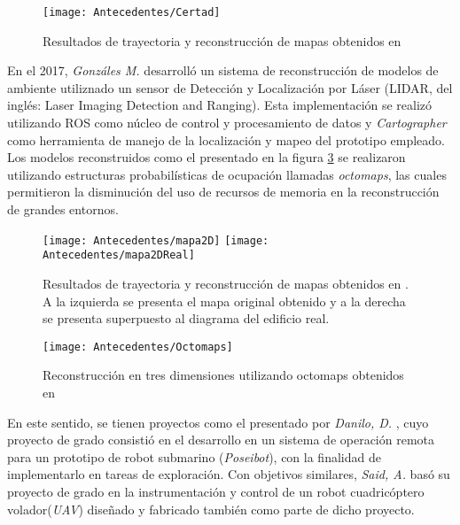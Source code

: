 \begin{figure}[H]
	\centering
	\texttt{[image: Antecedentes/Certad]}
	\caption{Resultados de trayectoria y reconstrucción de mapas obtenidos en \cite{novel}}
	\label{imagen:Antecedentes/Certad}
\end{figure}





En el 2017, \textit{Gonzáles M.} \cite{manuel} desarrolló un sistema de reconstrucción de modelos de ambiente utiliznado un sensor de Detección y Localización por Láser (LIDAR, del inglés: Laser Imaging Detection and Ranging). Esta implementación se realizó utilizando ROS como núcleo de control y procesamiento de datos y \textit{Cartographer} como herramienta de manejo de la localización y mapeo del prototipo empleado. Los modelos reconstruidos como el presentado en la figura \ref{imagen:Antecedentes/octomaps} se realizaron utilizando estructuras probabilísticas de ocupación llamadas \textit{octomaps}, las cuales permitieron la disminución del uso de recursos de memoria en la reconstrucción de grandes entornos.


\begin{figure}[H]
	\centering
	\texttt{[image: Antecedentes/mapa2D]}
	\texttt{[image: Antecedentes/mapa2DReal]}
	\caption{Resultados de trayectoria y reconstrucción de mapas obtenidos en \cite{manuel}. A la izquierda se presenta el mapa original obtenido y a la derecha se presenta superpuesto al diagrama del edificio real.}
	\label{imagen:Antecedentes/mapa2D}
\end{figure}


\begin{figure}[H]
	\centering
	\texttt{[image: Antecedentes/Octomaps]}
	\caption{Reconstrucción en tres dimensiones utilizando octomaps obtenidos
		en  \cite{manuel}}
	\label{imagen:Antecedentes/octomaps}
\end{figure}

 En este sentido, se tienen proyectos como el presentado por \textit{Danilo, D.} \cite{danilo}, cuyo proyecto de grado consistió en el desarrollo en un sistema de operación remota para un prototipo de robot submarino (\textit{Poseibot}), con la finalidad de implementarlo en tareas de exploración. Con objetivos similares, \textit{Said, A.} \cite{said} basó su proyecto de grado en la instrumentación y control de un robot cuadricóptero volador(\textit{UAV}) diseñado y fabricado también como parte de dicho proyecto. 

